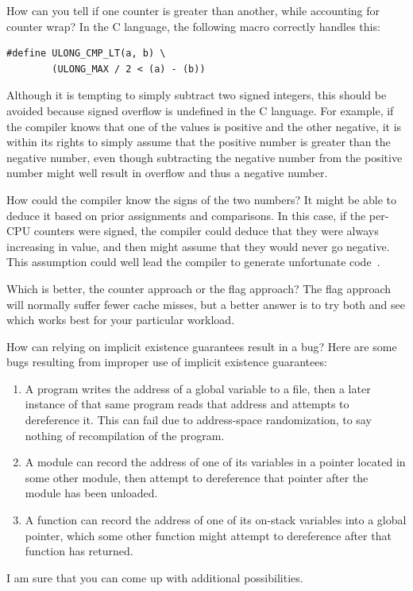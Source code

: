 \begin{enumerate}
\QuickQ{}
	How can you tell if one counter is greater than another,
	while accounting for counter wrap?
\QuickA{}
	In the C language, the following macro correctly handles this:

\vspace{5pt}
\begin{minipage}[t]{\columnwidth}
\small
\begin{verbatim}
#define ULONG_CMP_LT(a, b) \
        (ULONG_MAX / 2 < (a) - (b))
\end{verbatim}
\end{minipage}
\vspace{5pt}

	Although it is tempting to simply subtract two signed integers,
	this should be avoided because signed overflow is undefined
	in the C language.
	For example, if the compiler knows that one of the values is
	positive and the other negative, it is within its rights to
	simply assume that the positive number is greater than the
	negative number, even though subtracting the negative number
	from the positive number might well result in overflow and
	thus a negative number.

	How could the compiler know the signs of the two numbers?
	It might be able to deduce it based on prior assignments
	and comparisons.
	In this case, if the per-CPU counters were signed, the compiler
	could deduce that they were always increasing in value, and
	then might assume that they would never go negative.
	This assumption could well lead the compiler to generate
	unfortunate code~\cite{PaulEMcKenney2012SignedOverflow,JohnRegehr2010UndefinedBehavior}.

\QuickQ{}
	Which is better, the counter approach or the flag approach?
\QuickA{}
	The flag approach will normally suffer fewer cache misses,
	but a better answer is to try both and see which works best
	for your particular workload.

\QuickQ{}
	How can relying on implicit existence guarantees result in
	a bug?
\QuickA{}
	Here are some bugs resulting from improper use of implicit
	existence guarantees:
	\begin{enumerate}
	\item	A program writes the address of a global variable to
		a file, then a later instance of that same program
		reads that address and attempts to dereference it.
		This can fail due to address-space randomization,
		to say nothing of recompilation of the program.
	\item	A module can record the address of one of its variables
		in a pointer located in some other module, then attempt
		to dereference that pointer after the module has
		been unloaded.
	\item	A function can record the address of one of its on-stack
		variables into a global pointer, which some other
		function might attempt to dereference after that function
		has returned.
	\end{enumerate}
	I am sure that you can come up with additional possibilities.


\end{enumerate}
